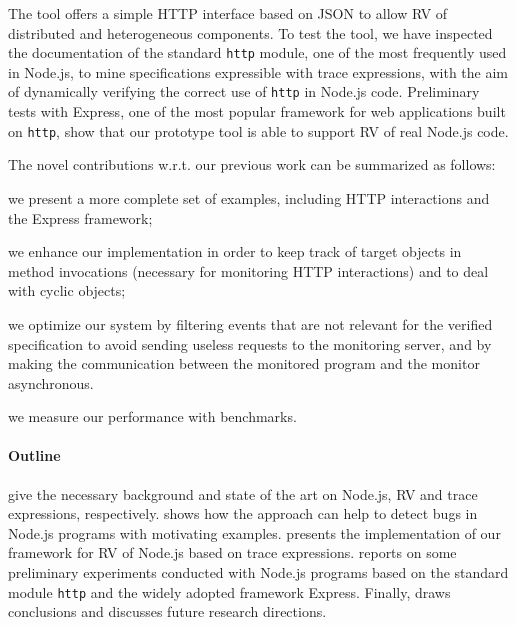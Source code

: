 The tool offers a simple HTTP interface based on JSON to allow RV of
distributed and heterogeneous components.
%
To test the tool, we have inspected the documentation of the standard \lstinline{http} module, one of the most frequently used 
in Node.js, to mine specifications expressible with trace expressions, with the aim of dynamically verifying
the correct use of \lstinline{http} in Node.js code.
Preliminary tests with Express, one of the most popular framework for web applications built on \lstinline{http}, show
that our prototype tool is able to support RV of real Node.js code.

The novel contributions w.r.t. our previous work \cite{TowardsIoT17} can be summarized as follows:
\begin{enumerate*}[label=(\alph*)]
	\item we present a more complete set of examples, including HTTP interactions and the Express framework;
	\item we enhance our implementation in order to keep track of target objects in method invocations (necessary for monitoring HTTP interactions) and to deal with cyclic objects;
	\item we optimize our system by filtering events that are not relevant for the verified specification to avoid sending useless requests to the monitoring server, and by making the communication between the monitored program and the monitor asynchronous.
	\item we measure our performance with benchmarks.
\end{enumerate*}

\paragraph{Outline}
 give the necessary background and state of the art on Node.js, RV and trace expressions, respectively.
 shows how the approach can help to detect bugs in Node.js programs with motivating examples.
 presents the implementation of our framework for RV of Node.js based on trace expressions.
 reports on some preliminary experiments conducted with Node.js programs based on the standard module
\lstinline{http} and the widely adopted framework Express.
Finally,  draws conclusions and discusses future research directions.
